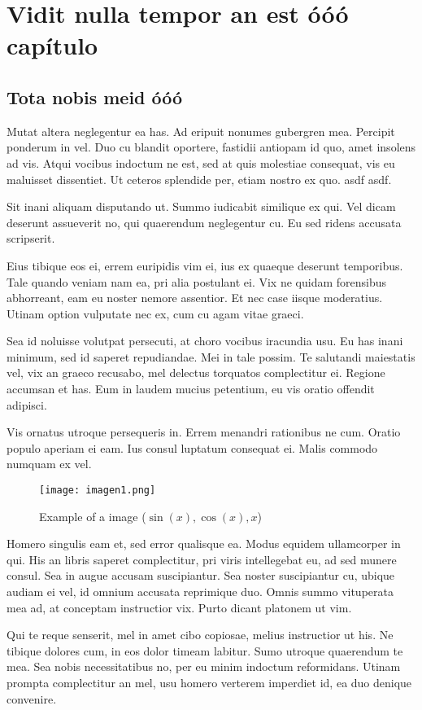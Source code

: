 \chapter{Vidit nulla tempor an est óóó capítulo}
\section{Tota nobis meid óóó}
Mutat altera neglegentur ea has. Ad eripuit nonumes gubergren mea. Percipit ponderum in vel. Duo cu blandit oportere, fastidii antiopam id quo, amet insolens ad vis. Atqui vocibus indoctum ne est, sed at quis molestiae consequat, vis eu maluisset dissentiet. Ut ceteros splendide per, etiam nostro ex quo. asdf \cite{einstein} asdf.

Sit inani aliquam disputando ut. Summo iudicabit similique ex qui. Vel dicam deserunt assueverit no, qui quaerendum neglegentur cu. Eu sed ridens accusata scripserit.

Eius tibique eos ei, errem euripidis vim ei, ius ex quaeque deserunt temporibus. Tale quando veniam nam ea, pri alia postulant ei. Vix ne quidam forensibus abhorreant, eam eu noster nemore assentior. Et nec case iisque moderatius. Utinam option vulputate nec ex, cum cu agam vitae graeci.

Sea id noluisse volutpat persecuti, at choro vocibus iracundia usu. Eu has inani minimum, sed id saperet repudiandae. Mei in tale possim. Te salutandi maiestatis vel, vix an graeco recusabo, mel delectus torquatos complectitur ei. Regione accumsan et has. Eum in laudem mucius petentium, eu vis oratio offendit adipisci.

Vis ornatus utroque persequeris in. Errem menandri rationibus ne cum. Oratio populo aperiam ei eam. Ius consul luptatum consequat ei. Malis commodo numquam ex vel.


\begin{figure}[h]
\caption{Example of a image ($\sin (x), \cos(x), x$)}
\centering
\texttt{[image: imagen1.png]}
\end{figure}

Homero singulis eam et, sed error qualisque ea. Modus equidem ullamcorper in qui. His an libris saperet complectitur, pri viris intellegebat eu, ad sed munere consul. Sea in augue accusam suscipiantur. Sea noster suscipiantur cu, ubique audiam ei vel, id omnium accusata reprimique duo. Omnis summo vituperata mea ad, at conceptam instructior vix. Purto dicant platonem ut vim.

Qui te reque senserit, mel in amet cibo copiosae, melius instructior ut his. Ne tibique dolores cum, in eos dolor timeam labitur. Sumo utroque quaerendum te mea. Sea nobis necessitatibus no, per eu minim indoctum reformidans. Utinam prompta complectitur an mel, usu homero verterem imperdiet id, ea duo denique convenire.

